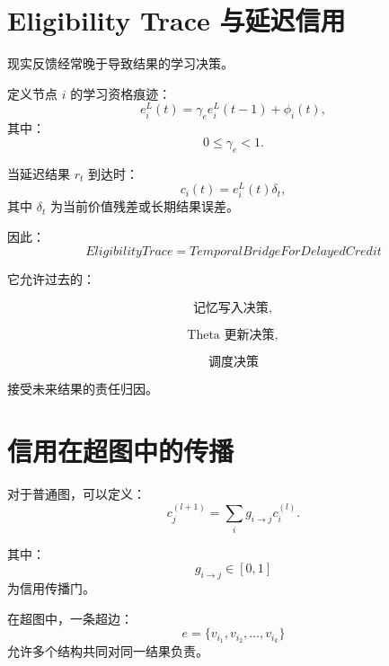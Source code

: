 \section{Eligibility Trace 与延迟信用}

现实反馈经常晚于导致结果的学习决策。

定义节点 $i$ 的学习资格痕迹：
\begin{equation}
e_i^L(t)
=
\gamma_e
e_i^L(t-1)
+
\phi_i(t),
\end{equation}
其中：
\begin{equation}
0\leq\gamma_e<1.
\end{equation}

当延迟结果 $r_t$ 到达时：
\begin{equation}
c_i(t)
=
e_i^L(t)
\delta_t,
\end{equation}
其中 $\delta_t$ 为当前价值残差或长期结果误差。

因此：
\begin{equation}
\boxed{
EligibilityTrace
=
TemporalBridgeForDelayedCredit
}
\end{equation}

它允许过去的：

\begin{equation}
\text{记忆写入决策},
\end{equation}

\begin{equation}
\text{Theta 更新决策},
\end{equation}

\begin{equation}
\text{调度决策}
\end{equation}

接受未来结果的责任归因。


\section{信用在超图中的传播}

对于普通图，可以定义：
\begin{equation}
c_j^{(l+1)}
=
\sum_i
g_{i\rightarrow j}
c_i^{(l)}.
\end{equation}

其中：
\begin{equation}
g_{i\rightarrow j}
\in[0,1]
\end{equation}
为信用传播门。

在超图中，一条超边：
\begin{equation}
e
=
\{v_{i_1},v_{i_2},\ldots,v_{i_k}\}
\end{equation}
允许多个结构共同对同一结果负责。

